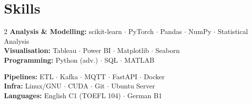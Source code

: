 \documentclass[10pt,a4paper]{article}
\begin{document}
\section{Skills}
\begin{multicols}{2}
\small\noindent
{\color{accent}\bfseries Analysis \& Modelling:} scikit-learn $\cdot$ PyTorch $\cdot$ Pandas $\cdot$ NumPy $\cdot$ Statistical Analysis\\[1pt]
{\color{accent}\bfseries Visualisation:} Tableau $\cdot$ Power BI $\cdot$ Matplotlib $\cdot$ Seaborn\\[1pt]
{\color{accent}\bfseries Programming:} Python (adv.) $\cdot$ SQL $\cdot$ MATLAB

\columnbreak
{\color{accent}\bfseries Pipelines:} ETL $\cdot$ Kafka $\cdot$ MQTT $\cdot$ FastAPI $\cdot$ Docker\\[1pt]
{\color{accent}\bfseries Infra:} Linux/GNU $\cdot$ CUDA $\cdot$ Git $\cdot$ Ubuntu Server\\[1pt]
{\color{accent}\bfseries Languages:} English C1 (TOEFL 104) $\cdot$ German B1
\end{multicols}
\end{document}
